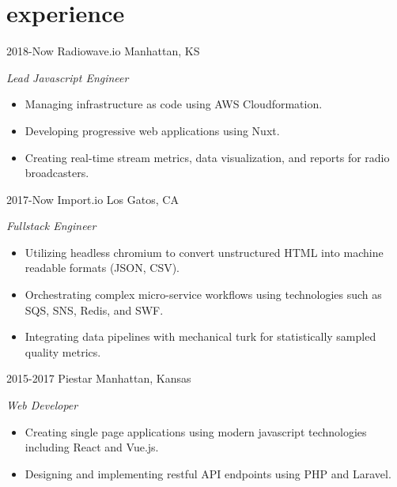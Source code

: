\documentclass[]{friggeri-cv} %
\begin{document}

\section{experience}

\begin{entrylist}

\entry
{2018-Now}
{Radiowave.io}
{Manhattan, KS}
{\emph{Lead Javascript Engineer} \\
\begin{itemize}
\item Managing infrastructure as code using AWS Cloudformation.
\item Developing progressive web applications using Nuxt.
\item Creating real-time stream metrics, data visualization, and reports for radio broadcasters.
\end{itemize}}

\entry
{2017-Now}
{Import.io}
{Los Gatos, CA}
{\emph{Fullstack Engineer} \\
\begin{itemize}
\item Utilizing headless chromium to convert unstructured HTML into machine readable formats (JSON, CSV).
\item Orchestrating complex micro-service workflows using technologies such as SQS, SNS, Redis, and SWF.
\item Integrating data pipelines with mechanical turk for statistically sampled quality metrics.
\end{itemize}}

\entry
{2015-2017}
{Piestar}
{Manhattan, Kansas}
{\emph{Web Developer} \\
\begin{itemize}
\item Creating single page applications using modern javascript technologies including React and Vue.js.
\item Designing and implementing restful API endpoints using PHP and Laravel.
\end{itemize}}

\end{entrylist}
\end{document}
